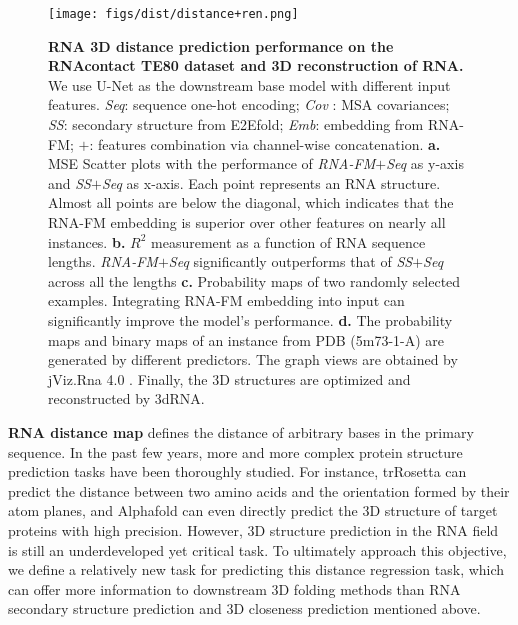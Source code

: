 \begin{figure}[!htbp]
    \centering
    \texttt{[image: figs/dist/distance+ren.png]}
    \caption{\textbf{RNA 3D distance prediction performance on the RNAcontact TE80 dataset and 3D reconstruction of RNA.} We use U-Net as the downstream base model with different input features. \textit{Seq}: sequence one-hot encoding; \textit{Cov} : MSA covariances; \textit{SS}: secondary structure from E2Efold; \textit{Emb}: embedding from RNA-FM; $+$: features combination via channel-wise concatenation. \textbf{a.} MSE Scatter plots with the performance of \textit{RNA-FM$+$Seq} as y-axis and \textit{SS$+$Seq} as x-axis. Each point represents an RNA structure. Almost all points are below the diagonal, which indicates that the RNA-FM embedding is superior over other features on nearly all instances. \textbf{b.} ${R^2}$ measurement as a function of RNA sequence lengths. \textit{RNA-FM$+$Seq} significantly outperforms that of \textit{SS$+$Seq} across all the lengths \textbf{c.} Probability maps of two randomly selected examples. Integrating RNA-FM embedding into input can significantly improve the model's performance. \textbf{d.} The probability maps and binary maps of an instance from PDB (5m73-1-A) are generated by different predictors. The graph views are obtained by jViz.Rna 4.0 \cite{shabash2017numerical}. Finally, the 3D structures are optimized and reconstructed by 3dRNA.}
    \label{fig:dist}
\end{figure}




\textbf{RNA distance map} defines the distance of arbitrary bases in the primary sequence. In the past few years, more and more complex protein structure prediction tasks have been thoroughly studied. For instance, trRosetta \cite{yang2020improved} can predict the distance between two amino acids and the orientation formed by their atom planes, and Alphafold \cite{alquraishi2019alphafold} can even directly predict the 3D structure of target proteins with high precision. However, 3D structure prediction in the RNA field is still an underdeveloped yet critical task. To ultimately approach this objective, we define a relatively new task for predicting this distance regression task, which can offer more information to downstream 3D folding methods than RNA secondary structure prediction \cite{singh2019rna} and 3D closeness prediction \cite{sun2021rna} mentioned above.


